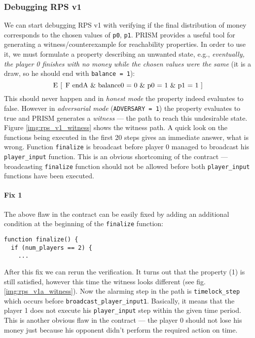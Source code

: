 \documentclass{article}
\begin{document}
\subsubsection{Debugging RPS v1}
We can start debugging RPS v1 with verifying if the final distribution of money corresponds to the chosen values 
of \lstinline{p0}, \lstinline{p1}.
PRISM provides a useful tool for generating a witness/counterexample for reachability properties.
In order to use it, we must formulate a property describing an unwanted state, e.g., 
\textit{eventually, the player 0 finishes with no money
while the chosen values were the same} (it is a draw, so he should end with \lstinline{balance = 1}):
\begin{equation}
\text{\lstinline{E [ F endA & balance0 = 0 & p0 = 1 & p1 = 1 ]}}
\label{prop:rps_v1_witness}
\end{equation}
This should never happen and in \emph{honest mode} the property indeed evaluates to false.
However in \emph{adversarial mode} (\lstinline{ADVERSARY = 1}) the property evaluates to true and PRISM
generates a \emph{witness} --- the path to reach this undesirable state.
Figure \ref{img:rps_v1_witness} shows the witness path.
A quick look on the functions being executed in the first 20 steps gives an immediate answer, what is wrong.
Function \lstinline{finalize} is broadcast before player 0 managed to broadcast his \lstinline{player_input} function.
This is an obvious shortcoming of the contract --- broadcasting \lstinline{finalize} function should not be allowed
before both \lstinline{player_input} functions have been executed.

\paragraph{Fix 1} 

The above flaw in the contract can be easily fixed by adding an additional condition at the beginning of the 
\lstinline{finalize} function:
\begin{lstlisting}
function finalize() {
  if (num_players == 2) {
    ...
\end{lstlisting}

After this fix we can rerun the verification.
It turns out that the property (1) is still satisfied, however this
time the witness looks different (see fig. \ref{img:rps_v1a_witness}).
Now the alarming step in the path is \lstinline{timelock_step} which occurs before \lstinline{broadcast_player_input1}.
Basically, it means that the player 1 does not execute his \lstinline{player_input} step within the given time period.
This is another obvious flaw in the contract --- the player 0 should not lose his money just because his opponent
didn't perform the required action on time.
\end{document}
